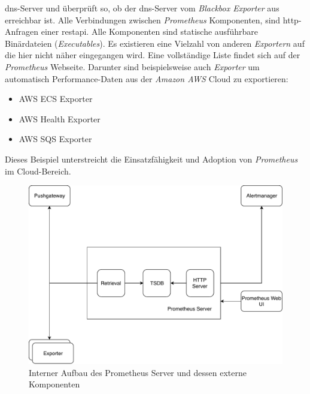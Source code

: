\documentclass[titlepage]{report}
\begin{document}
\gls{dns}\hyp{}Server und überprüft so, ob der \gls{dns}\hyp{}Server vom
\emph{Blackbox Exporter} aus erreichbar ist.  Alle Verbindungen zwischen
\emph{Prometheus} Komponenten, sind \gls{http}\hyp{}Anfragen einer
\gls{restapi}. Alle Komponenten sind statische ausführbare Binärdateien
(\emph{Executables}). Es existieren eine Vielzahl von anderen
\emph{Exportern} auf die hier nicht näher eingegangen wird. Eine
vollständige Liste findet sich auf der \emph{Prometheus} Webseite.
Darunter sind beispielsweise auch \emph{Exporter} um automatisch
Performance\hyp{}Daten aus der \emph{Amazon AWS} Cloud zu
exportieren\cite{PROMETHEUS_EXPORTERS}:
\begin{itemize}
    \item AWS ECS Exporter\cite{ECS_EXPORTER}
    \item AWS Health Exporter\cite{AWS_HEALTH}
    \item AWS SQS Exporter\cite{SQS_EXPORTER}
\end{itemize}
Dieses Beispiel unterstreicht die Einsatzfähigkeit und Adoption von
\emph{Prometheus} im Cloud\hyp{}Bereich.
\begin{figure}[H]
    \centering
    \includegraphics[width=1.0\textwidth]{figures/prometheus.pdf}
    \caption{Interner Aufbau des Prometheus Server und dessen
    externe Komponenten}\label{fig:prometheus}
\end{figure}
\end{document}
